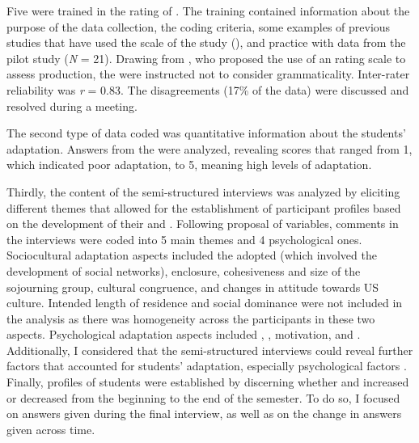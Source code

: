 \documentclass[output=paper]{langsci/langscibook}
\begin{document}
Five  were trained in the rating of  . The training contained information about the purpose of the data collection, the coding criteria, some examples of previous studies that have used the  scale of the study (\citealt{Taguchi2011,Taguchi2013}), and practice with data from the pilot study (\textit{N} = 21). Drawing from \citet{HudsonEtAl1995}, who proposed the use of an  rating scale to assess  production, the  were instructed not to consider grammaticality. Inter-rater reliability was \textit{r} = 0.83. The disagreements (17\% of the data) were discussed and resolved during a meeting.

The second type of data coded was quantitative information about the students’  adaptation. Answers from the  were analyzed, revealing scores that ranged from 1, which indicated poor  adaptation, to 5, meaning high levels of adaptation. 

Thirdly, the content of the semi-structured interviews was analyzed by eliciting different themes that allowed for the establishment of participant profiles based on the development of their  and . Following  proposal of  variables, comments in the interviews were coded into 5 main  themes and 4 psychological ones. Sociocultural adaptation aspects included the  adopted (which involved the development of social networks), enclosure, cohesiveness and size of the sojourning group, cultural congruence, and changes in attitude towards US culture. Intended length of residence and social dominance were not included in the analysis as there was homogeneity across the participants in these two aspects. Psychological adaptation aspects included , , motivation, and . Additionally, I considered that the semi-structured interviews could reveal further factors that accounted for students’ adaptation, especially psychological factors \citep{Schumann1986}. Finally,  profiles of students were established by discerning whether  and  increased or decreased from the beginning to the end of the semester. To do so, I focused on answers given during the final interview, as well as on the change in answers given across time.  
\end{document}
